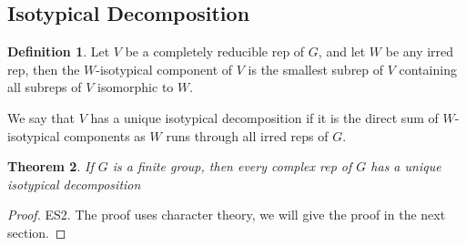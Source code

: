 \documentclass{article}
\theoremstyle{definition}
\newtheorem{defn}{Definition}[section]
\theoremstyle{remark}
\theoremstyle{plain}
\newtheorem{thm}[defn]{Theorem}
\begin{document}
\subsection{Isotypical Decomposition}
\begin{defn}
    Let $V$ be a completely reducible rep of $G$, and let $W$ be any irred rep, then the $W$-isotypical component of $V$ is the smallest subrep of $V$ containing all subreps of $V$ isomorphic to $W$.

    We say that $V$ has a unique isotypical decomposition if it is the direct sum of $W$-isotypical components as $W$ runs through all irred reps of $G$.
\end{defn}
\begin{thm}
    If $G$ is a finite group, then every complex rep of $G$ has a unique isotypical decomposition
\end{thm}
\begin{proof}
    ES2. The proof uses character theory, we will give the proof in the next section.
\end{proof}
\end{document}
